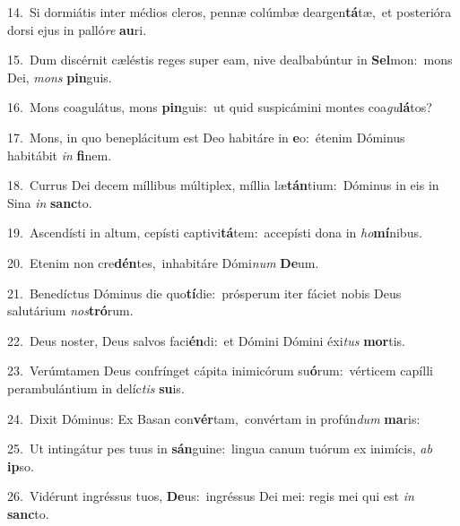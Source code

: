 {\numbfont\textcolor{\numbcolor}{14.}}~Si dormiátis inter médios cleros, pennæ colúmbæ deargen\-\textbf{tá}\-tæ,~\star et posterióra dorsi ejus in palló\textit{re} \textbf{au}\-ri.\par
{\numbfont\textcolor{\numbcolor}{15.}}~Dum discérnit cæléstis reges super eam, nive dealbabúntur in \textbf{Sel}\-mon:~\star mons Dei, \textit{mons} \textbf{pin}\-guis.\par
{\numbfont\textcolor{\numbcolor}{16.}}~Mons coagulátus, mons \textbf{pin}\-guis:~\star ut quid suspicámini montes coa\-\textit{gu}\-\textbf{lá}tos?\par
{\numbfont\textcolor{\numbcolor}{17.}}~Mons, in quo beneplácitum est Deo habitáre in \textbf{e}\-o:~\star étenim Dóminus habitábit \textit{in} \textbf{fi}\-nem.\par
{\numbfont\textcolor{\numbcolor}{18.}}~Currus Dei decem míllibus múltiplex, míllia læ\-\textbf{tán}\-tium:~\star Dóminus in eis in Sina \textit{in} \textbf{sanc}\-to.\par
{\numbfont\textcolor{\numbcolor}{19.}}~Ascendísti in altum, cepísti captivi\-\textbf{tá}\-tem:~\star accepísti dona in \textit{ho}\-\textbf{mí}nibus.\par
{\numbfont\textcolor{\numbcolor}{20.}}~Etenim non cre\-\textbf{dén}\-tes,~\star inhabitáre Dómi\textit{num} \textbf{De}\-um.\par
{\numbfont\textcolor{\numbcolor}{21.}}~Benedíctus Dóminus die quo\-\textbf{tí}\-die:~\star prósperum iter fáciet nobis Deus salutárium \textit{nos}\-\textbf{tró}rum.\par
{\numbfont\textcolor{\numbcolor}{22.}}~Deus noster, Deus salvos faci\-\textbf{én}\-di:~\star et Dómini Dómini éxi\textit{tus} \textbf{mor}\-tis.\par
{\numbfont\textcolor{\numbcolor}{23.}}~Verúmtamen Deus confrínget cápita inimicórum su\-\textbf{ó}\-rum:~\star vérticem capílli perambulántium in delíc\textit{tis} \textbf{su}\-is.\par
{\numbfont\textcolor{\numbcolor}{24.}}~Dixit Dóminus: Ex Basan con\-\textbf{vér}\-tam,~\star convértam in profún\textit{dum} \textbf{ma}\-ris:\par
{\numbfont\textcolor{\numbcolor}{25.}}~Ut intingátur pes tuus in \textbf{sán}\-guine:~\star lingua canum tuórum ex inimícis, \textit{ab} \textbf{ip}\-so.\par
{\numbfont\textcolor{\numbcolor}{26.}}~Vidérunt ingréssus tuos, \textbf{De}\-us:~\star ingréssus Dei mei: regis mei qui est \textit{in} \textbf{sanc}\-to.\par
